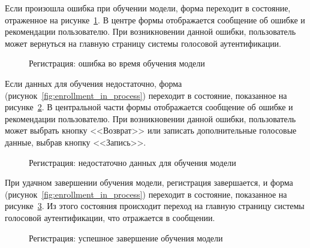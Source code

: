 Если произошла ошибка при обучении модели, форма переходит в состояние, отраженное на рисунке~\ref{fig:enrollment_error_in_learning}. В центре формы отображается сообщение об ошибке и рекомендации пользователю. При возникновении данной ошибки, пользователь может вернуться на главную страницу системы голосовой аутентификации.

\begin{figure}[hbt!]
\caption{Регистрация: ошибка во время обучения модели}
\label{fig:enrollment_error_in_learning}
\end{figure}

Если данных для обучения недостаточно, форма (рисунок~\ref{fig:enrollment_in_process}) переходит в состояние, показанное на рисунке~\ref{fig:enrollment_need_more_data}. В центральной части формы отображается сообщение об ошибке и рекомендации пользователю. При возникновении данной ошибки, пользователь может выбрать кнопку <<Возврат>> или записать дополнительные голосовые данные, выбрав кнопку <<Запись>>.


\begin{figure}[hbt!]
\caption{Регистрация: недостаточно данных для обучения модели}
\label{fig:enrollment_need_more_data}
\end{figure}

При удачном завершении обучения модели, регистрация завершается, и форма (рисунок~\ref{fig:enrollment_in_process}) переходит в состояние, показанное на рисунке~\ref{fig:enrollment_success}. Из этого состояния происходит переход на главную страницу системы голосовой аутентификации, что отражается в сообщении.   


\begin{figure}[hbt!]
\caption{Регистрация: успешное завершение обучения модели}
\label{fig:enrollment_success}
\end{figure}

